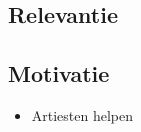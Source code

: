 \subsection{Relevantie}

\subsection{Motivatie}
\begin{itemize}
    \item Artiesten helpen
\end{itemize}
